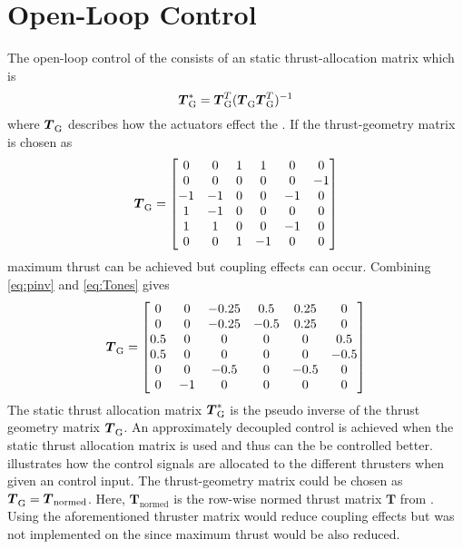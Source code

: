 \section{Open-Loop Control} \label{sec:openloop}   
The open-loop control of the \abbrROV consists of an static thrust-allocation matrix which is
\begin{equation} \label{eq:pinv}
    \thrusterGeometryOnes[*] = \thrusterGeometryOnes[T](\thrusterGeometryOnes \thrusterGeometryOnes[T])^{-1}
\end{equation}
where $\thrusterGeometryOnes$ describes how the actuators effect the \abbrROV \citep{thrustallocation}. If the thrust-geometry matrix is chosen as
\begin{equation} \label{eq:Tones}
    \thrusterGeometryOnes = 
    \begin{bmatrix}
    0  & 0  & 1 & 1  &  0 &  0 \\
    0  & 0  & 0 & 0  &  0 & -1 \\
    -1 & -1 & 0 & 0  & -1 &  0 \\
    1  & -1 & 0 & 0  &  0 &  0 \\
    1  & 1  & 0 & 0  & -1 &  0 \\
    0  & 0  & 1 & -1 &  0 &  0 \\
    \end{bmatrix}
\end{equation}
maximum thrust can be achieved but coupling effects can occur. Combining \eqref{eq:pinv} and \eqref{eq:Tones} gives
\begin{equation}
\thrusterGeometryOnes= \begin{bmatrix}
0 & 0 & -0.25 & 0.5 & 0.25 & 0 \\
0 & 0 & -0.25 & -0.5 & 0.25 & 0 \\
0.5 & 0 & 0 & 0 & 0 & 0.5 \\
0.5 & 0 & 0 & 0 & 0 & -0.5 \\
0 & 0 & -0.5 & 0 & -0.5 & 0 \\
0 & -1 & 0 & 0 & 0 & 0 \\
\end{bmatrix}
\end{equation}
The static thrust allocation matrix $\thrusterGeometryOnes[*]$ is the pseudo inverse of the thrust geometry matrix $\thrusterGeometryOnes$. An approximately decoupled control is achieved when the static thrust allocation matrix is used and thus can the \abbrROV be controlled better.  illustrates how the control signals are allocated to the different thrusters when given an control input. The thrust-geometry matrix could be chosen as $\thrusterGeometryOnes = \boldsymbol{T}_{\text{normed}}$. Here, $\boldsymbol{T}_{\text{normed}}$ is the row-wise normed thrust matrix $\boldsymbol{T}$ from . Using the aforementioned thruster matrix would reduce coupling effects but was not implemented on the \abbrROV since maximum thrust would be also reduced.
